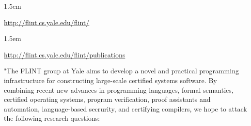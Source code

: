 \documentclass[12pt,twoside]{article}
\begin{document}
\begin{mddefinitions}%


\begin{mdbmarginx}{}{}{}{1.5em}%
\begin{mddefdata}%
\href{http://flint.cs.yale.edu/flint/}{{\ttfamily http://\hspace{0pt}flint.\hspace{0pt}cs.\hspace{0pt}yale.\hspace{0pt}edu/\hspace{0pt}flint/\hspace{0pt}}}
\end{mddefdata}%
\end{mdbmarginx}%


\begin{mdbmarginx}{}{}{}{1.5em}%
\begin{mddefdata}%
\href{http://flint.cs.yale.edu/flint/publications}{{\ttfamily http://\hspace{0pt}flint.\hspace{0pt}cs.\hspace{0pt}yale.\hspace{0pt}edu/\hspace{0pt}flint/\hspace{0pt}publications}}%
\end{mddefdata}%
\end{mdbmarginx}%
\end{mddefinitions}%

\noindent{}"The FLINT group at Yale aims to develop a novel and practical
programming infrastructure for constructing large-scale certified
systems software. By combining recent new advances in programming
languages, formal semantics, certified operating systems, program
verification, proof assistants and automation, language-based
secrurity, and certifying compilers, we hope to attack the following
research questions:%
\end{document}
